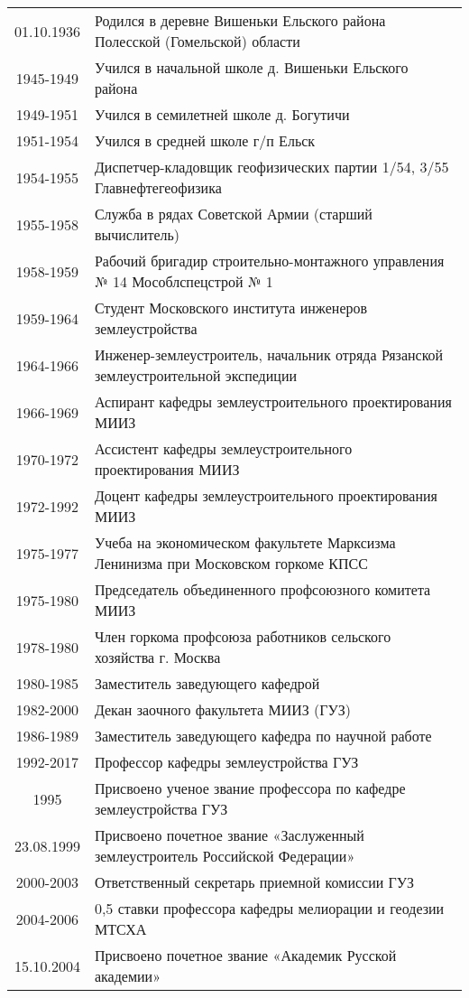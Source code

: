 \begin{flushleft}
{\small
	\begin{tabularx}{\textwidth}{cX}
		01.10.1936	&	Родился в деревне Вишеньки Ельского района Полесской (Гомельской) области			\\
		1945-1949		&	Учился в начальной школе д. Вишеньки Ельского района								\\
		1949-1951		&	Учился в семилетней школе д. Богутичи												\\
		1951-1954		&	Учился в средней школе г/п Ельск													\\
		1954-1955		&	Диспетчер-кладовщик геофизических партии 1/54, 3/55 Главнефтегеофизика				\\
		1955-1958		&	Служба в рядах Советской Армии (старший вычислитель)								\\
		1958-1959		&	Рабочий бригадир строительно-монтажного управления № 14 Мособлспецстрой № 1		\\
		1959-1964		&	Студент Московского института инженеров землеустройства							\\
		1964-1966		&	Инженер-землеустроитель, начальник отряда  Рязанской землеустроительной экспедиции	\\
		1966-1969		&	Аспирант кафедры землеустроительного проектирования МИИЗ							\\
		1970-1972		&	Ассистент кафедры землеустроительного проектирования МИИЗ							\\
		1972-1992		&	Доцент кафедры землеустроительного проектирования МИИЗ								\\
		1975-1977		&	Учеба на экономическом факультете Марксизма Ленинизма при Московском горкоме КПСС	\\
		1975-1980		&	Председатель объединенного профсоюзного комитета МИИЗ								\\
		1978-1980		&	Член горкома профсоюза работников сельского хозяйства г. Москва						\\
		1980-1985		&	Заместитель заведующего кафедрой													\\
		1982-2000		&	Декан заочного факультета МИИЗ (ГУЗ)												\\
		1986-1989		&	Заместитель заведующего кафедра по научной работе									\\
		1992-2017		&	Профессор кафедры землеустройства ГУЗ												\\
		1995				&	Присвоено ученое звание профессора по кафедре землеустройства ГУЗ					\\
		23.08.1999	&	Присвоено почетное звание «Заслуженный землеустроитель Российской Федерации»		\\
		2000-2003		&	Ответственный секретарь приемной комиссии ГУЗ										\\
		2004-2006		&	0,5 ставки профессора кафедры мелиорации и геодезии МТСХА							\\
		15.10.2004	&	Присвоено почетное звание «Академик Русской академии»									\\
	\end{tabularx}
}
\end{flushleft}

\clearpage